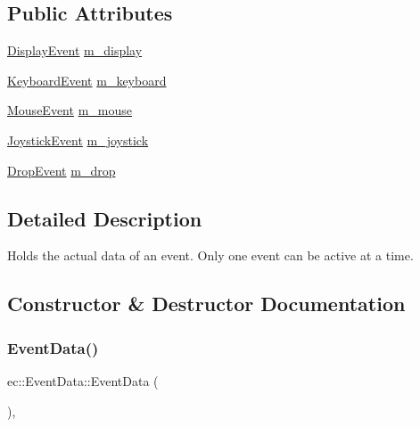 \subsection*{Public Attributes}
\begin{DoxyCompactItemize}
\item 
\mbox{\hyperlink{structec_1_1_display_event}{Display\+Event}} \mbox{\hyperlink{unionec_1_1_event_data_a557f2780b1d3eadf848b99a501a95f58}{m\+\_\+display}}
\item 
\mbox{\hyperlink{structec_1_1_keyboard_event}{Keyboard\+Event}} \mbox{\hyperlink{unionec_1_1_event_data_a76d355d62f63e9947187e08bc520af45}{m\+\_\+keyboard}}
\item 
\mbox{\hyperlink{structec_1_1_mouse_event}{Mouse\+Event}} \mbox{\hyperlink{unionec_1_1_event_data_a77d2274d869ab46f8f5f1e5d9616d4d3}{m\+\_\+mouse}}
\item 
\mbox{\hyperlink{structec_1_1_joystick_event}{Joystick\+Event}} \mbox{\hyperlink{unionec_1_1_event_data_ab45002b3b3e993ed2a6d4d2afb5a7a27}{m\+\_\+joystick}}
\item 
\mbox{\hyperlink{structec_1_1_drop_event}{Drop\+Event}} \mbox{\hyperlink{unionec_1_1_event_data_a3fc172a18118e8079ec35ecbeceddff1}{m\+\_\+drop}}
\end{DoxyCompactItemize}


\subsection{Detailed Description}
Holds the actual data of an event. Only one event can be active at a time. 

\subsection{Constructor \& Destructor Documentation}
\mbox{\label{unionec_1_1_event_data_a8276eb2c2eee85aeb6d6911992affce6}} 
\subsubsection{\texorpdfstring{Event\+Data()}{EventData()}}
{\footnotesize\ttfamily ec\+::\+Event\+Data\+::\+Event\+Data (\begin{DoxyParamCaption}{ }\end{DoxyParamCaption})\hspace{0.3cm}{\ttfamily [explicit]}, {\ttfamily [default]}}

